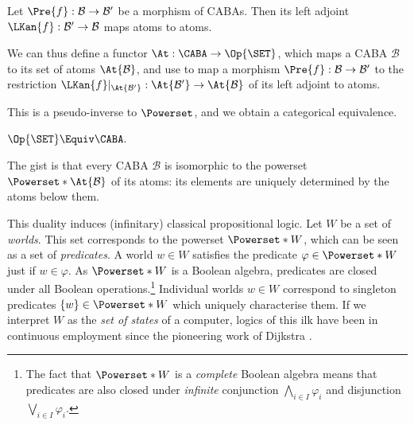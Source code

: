 \documentclass[a4paper,UKenglish,cleveref, autoref]{lipics-v2021}
\begin{document}

\begin{lemma}
  \label{lemma:left-adj-atoms}
  Let $\Pre{f} : \mathcal{B} \to \mathcal{B}'$ be a morphism of CABAs. Then its
  left adjoint $\LKan{f} : \mathcal{B}' \to \mathcal{B}$ maps atoms to atoms.
\end{lemma}

We can thus define a functor $\At : \CABA \to \Op{\SET}$, which maps a CABA
$\mathcal{B}$ to its set of atoms $\At{\mathcal{B}}$, and use
 to map a morphism
$\Pre{f} : \mathcal{B} \to \mathcal{B}'$ to the restriction
$\LKan{f}|_{\At{\mathcal{B}'}} : \At{\mathcal{B}'} \to \At{\mathcal{B}}$ of its
left adjoint to atoms.

This is a pseudo-inverse to $\Powerset$, and we obtain a categorical
equivalence.

\begin{theorem}
  $\Op{\SET} \Equiv \CABA.$
\end{theorem}

The gist is that every CABA $\mathcal{B}$ is isomorphic to the powerset
$\Powerset*{\At{\mathcal{B}}}$ of its atoms: its elements are uniquely
determined by the atoms below them.

This duality induces (infinitary) classical propositional logic. Let $W$ be a
set of \emph{worlds}. This set corresponds to the powerset $\Powerset*{W}$,
which can be seen as a set of \emph{predicates}. A world $w \in W$ satisfies the
predicate $\varphi \in \Powerset*{W}$ just if $w \in \varphi$. As
$\Powerset*{W}$ is a Boolean algebra, predicates are closed under all Boolean
operations.\footnote{The fact that $\Powerset*{W}$ is a \emph{complete} Boolean
  algebra means that predicates are also closed under \emph{infinite}
conjunction $\bigwedge_{i \in I} \varphi_i$ and disjunction $\bigvee_{i \in I}
\varphi_i$.} Individual worlds $w \in W$ correspond to singleton predicates $\{
w \} \in \Powerset*{W}$ which uniquely characterise them. If we interpret $W$ as
the \emph{set of states} of a computer, logics of this ilk have been in
continuous employment since the pioneering work of Dijkstra
\cite{dijkstra_1976}.
\end{document}

